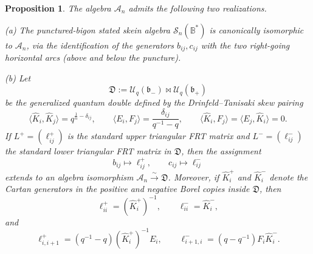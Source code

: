 \documentclass[11pt]{article}
\newtheorem{proposition}[theorem]{Proposition}
\newcommand{\Uc}{\mathcal U}
\newcommand{\bcS}{\mathcal S}
\newcommand{\fb}{\mathfrak b}
\newcommand{\fB}{\mathbb B}
\newcommand{\bipr}{\mathbin{\bowtie}}
\begin{document}
\begin{proposition}\label{prop:two-presentations}
The algebra \(\mathcal A_n\) admits the following two realizations.

\smallskip

\noindent\textup{(a)} The punctured-bigon stated skein algebra \(\bcS_n(\fB^\ast)\) is canonically isomorphic to \(\mathcal A_n\), via the identification of the generators \(b_{ij},c_{ij}\) with the two right-going horizontal arcs (above and below the puncture).

\smallskip

\noindent\textup{(b)} Let
\[
\mathfrak D:=\Uc_q(\fb_-)\bipr \Uc_q(\fb_+)
\]
be the generalized quantum double defined by the Drinfeld--Tanisaki skew pairing
\[
\langle \hat K_i,\hat K_j\rangle=q^{\frac1n-\delta_{ij}},
\qquad
\langle E_i,F_j\rangle=\frac{\delta_{ij}}{q^{-1}-q},
\qquad
\langle \hat K_i,F_j\rangle=\langle E_j,\hat K_i\rangle=0.
\]
If \(L^+=(\ell^+_{ij})\) is the standard upper triangular FRT matrix and
\(L^-=(\ell^-_{ij})\) the standard lower triangular FRT matrix in \(\mathfrak D\),
then the assignment
\[
b_{ij}\longmapsto \ell^+_{ij},\qquad
c_{ij}\longmapsto \ell^-_{ij}
\]
extends to an algebra isomorphism \(\mathcal A_n\xrightarrow{\sim}\mathfrak D\).
Moreover, if \(\hat K_i^+\) and \(\hat K_i^-\) denote the Cartan generators in the positive and negative Borel copies inside \(\mathfrak D\), then
\begin{equation}\label{eq:simple-coeffs}
\ell^+_{ii}=(\hat K_i^+)^{-1},\qquad
\ell^-_{ii}=\hat K_i^-,
\end{equation}
and
\begin{equation}\label{eq:simple-offdiag}
\ell^+_{i,i+1}=(q^{-1}-q)(\hat K_i^+)^{-1}E_i,\qquad
\ell^-_{i+1,i}=(q-q^{-1})F_i\hat K_i^-.
\end{equation}
\end{proposition}
\end{document}
